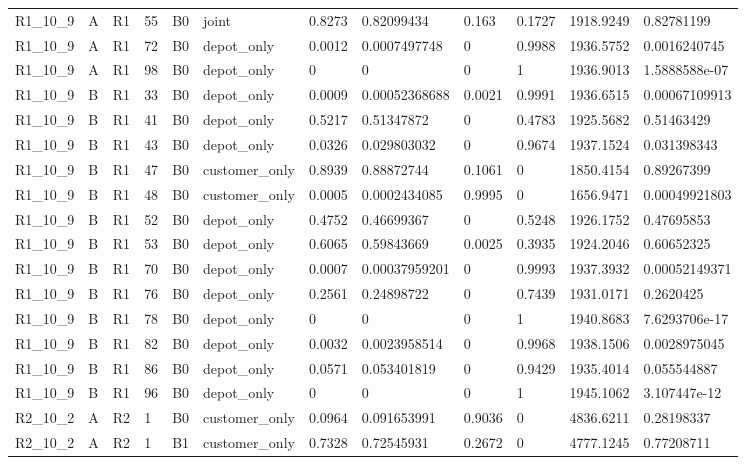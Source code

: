 \begin{longtable}{llllllllllll}
R1\_10\_9 & A & R1 & 55 & B0 & joint & 0.8273 & 0.82099434 & 0.163 & 0.1727 & 1918.9249 & 0.82781199 \\
R1\_10\_9 & A & R1 & 72 & B0 & depot\_only & 0.0012 & 0.0007497748 & 0 & 0.9988 & 1936.5752 & 0.0016240745 \\
R1\_10\_9 & A & R1 & 98 & B0 & depot\_only & 0 & 0 & 0 & 1 & 1936.9013 & 1.5888588e-07 \\
R1\_10\_9 & B & R1 & 33 & B0 & depot\_only & 0.0009 & 0.00052368688 & 0.0021 & 0.9991 & 1936.6515 & 0.00067109913 \\
R1\_10\_9 & B & R1 & 41 & B0 & depot\_only & 0.5217 & 0.51347872 & 0 & 0.4783 & 1925.5682 & 0.51463429 \\
R1\_10\_9 & B & R1 & 43 & B0 & depot\_only & 0.0326 & 0.029803032 & 0 & 0.9674 & 1937.1524 & 0.031398343 \\
R1\_10\_9 & B & R1 & 47 & B0 & customer\_only & 0.8939 & 0.88872744 & 0.1061 & 0 & 1850.4154 & 0.89267399 \\
R1\_10\_9 & B & R1 & 48 & B0 & customer\_only & 0.0005 & 0.0002434085 & 0.9995 & 0 & 1656.9471 & 0.00049921803 \\
R1\_10\_9 & B & R1 & 52 & B0 & depot\_only & 0.4752 & 0.46699367 & 0 & 0.5248 & 1926.1752 & 0.47695853 \\
R1\_10\_9 & B & R1 & 53 & B0 & depot\_only & 0.6065 & 0.59843669 & 0.0025 & 0.3935 & 1924.2046 & 0.60652325 \\
R1\_10\_9 & B & R1 & 70 & B0 & depot\_only & 0.0007 & 0.00037959201 & 0 & 0.9993 & 1937.3932 & 0.00052149371 \\
R1\_10\_9 & B & R1 & 76 & B0 & depot\_only & 0.2561 & 0.24898722 & 0 & 0.7439 & 1931.0171 & 0.2620425 \\
R1\_10\_9 & B & R1 & 78 & B0 & depot\_only & 0 & 0 & 0 & 1 & 1940.8683 & 7.6293706e-17 \\
R1\_10\_9 & B & R1 & 82 & B0 & depot\_only & 0.0032 & 0.0023958514 & 0 & 0.9968 & 1938.1506 & 0.0028975045 \\
R1\_10\_9 & B & R1 & 86 & B0 & depot\_only & 0.0571 & 0.053401819 & 0 & 0.9429 & 1935.4014 & 0.055544887 \\
R1\_10\_9 & B & R1 & 96 & B0 & depot\_only & 0 & 0 & 0 & 1 & 1945.1062 & 3.107447e-12 \\
R2\_10\_2 & A & R2 & 1 & B0 & customer\_only & 0.0964 & 0.091653991 & 0.9036 & 0 & 4836.6211 & 0.28198337 \\
R2\_10\_2 & A & R2 & 1 & B1 & customer\_only & 0.7328 & 0.72545931 & 0.2672 & 0 & 4777.1245 & 0.77208711 \\

\end{longtable}

